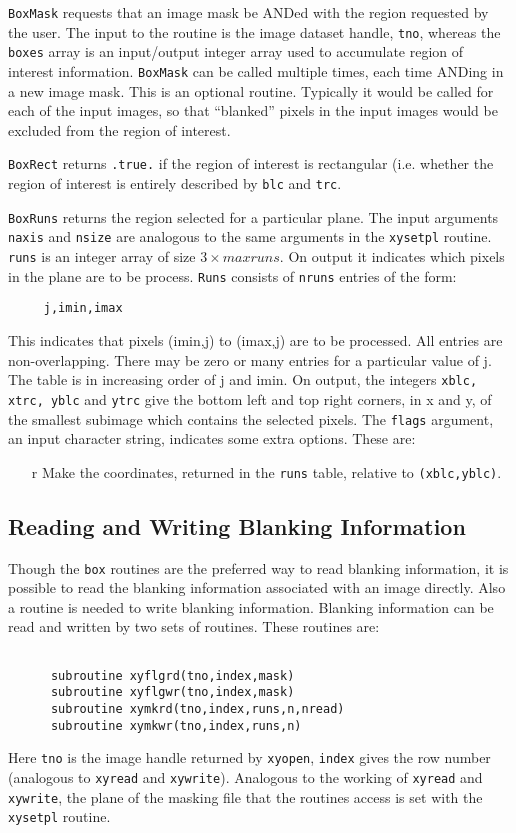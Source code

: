 \documentclass{report}
\begin{document}
{\tt BoxMask} requests that an image mask be ANDed with the region
requested by the user. The input to the routine is the image dataset handle,
{\tt tno}, whereas the {\tt boxes} array is an input/output integer array
used to accumulate region of interest information. {\tt BoxMask} can be
called multiple times, each time ANDing in a new image mask. This is an optional
routine. Typically it would be called for each of the input images, so that
``blanked'' pixels in the input images would be excluded from the region of
interest.

{\tt BoxRect} returns {\tt .true.} if the region
of interest is rectangular (i.e. whether the region of interest is entirely
described by {\tt blc} and {\tt trc}.

{\tt BoxRuns} returns the region selected for a particular plane.
The input arguments {\tt naxis} and {\tt nsize} are analogous to the same
arguments in the {\tt xysetpl} routine. {\tt runs} is
an integer array of size $3\times maxruns$. On output it indicates which
pixels in the plane are to be process.
{\tt Runs} consists of {\tt nruns} entries of the form:
\begin{verbatim}
     j,imin,imax
\end{verbatim}
This indicates that pixels (imin,j) to (imax,j) are to be processed.
All entries are non-overlapping.
There may be zero or many  entries for a particular value of j. The
table is in increasing order of j and imin. On output, the integers
{\tt xblc, xtrc, yblc} and {\tt ytrc} give the bottom left and top right
corners, in x and y, of the smallest subimage which contains the selected
pixels.
The {\tt flags} argument, an input character
string, indicates some extra options. These are:
\begin{itemize}
\item[r] Make the coordinates, returned in the {\tt runs} table,
relative to {\tt (xblc,yblc)}.
\end{itemize}

\subsection{Reading and Writing Blanking Information}
Though the {\tt box} routines are the preferred way to read blanking
information, it is possible to read the blanking information associated with
an image directly. Also a routine is needed to write blanking information.
Blanking information can be read and written by two sets of routines.
These routines are:
\begin{verbatim}

      subroutine xyflgrd(tno,index,mask)
      subroutine xyflgwr(tno,index,mask)
      subroutine xymkrd(tno,index,runs,n,nread)
      subroutine xymkwr(tno,index,runs,n)

\end{verbatim}
Here {\tt tno} is the image handle returned by {\tt xyopen}, {\tt index} gives
the row number (analogous to {\tt xyread} and {\tt xywrite}).
Analogous to the working of {\tt xyread} and {\tt xywrite}, the plane of the
masking file that the routines access is set with the {\tt xysetpl} routine.
\end{document}

